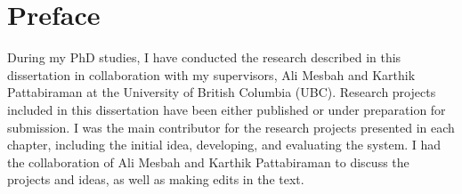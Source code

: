 
\chapter{Preface}
During my PhD studies, I have conducted the research described in this dissertation in collaboration with my supervisors, Ali Mesbah and Karthik Pattabiraman at the University of British Columbia (UBC). 
Research projects included in this dissertation have been either published or under preparation for submission. I was the main contributor for the research projects presented in each chapter, including the initial idea, developing, and evaluating the system. I had the collaboration of Ali Mesbah and Karthik Pattabiraman to discuss the projects and ideas, as well as making edits in the text. 

